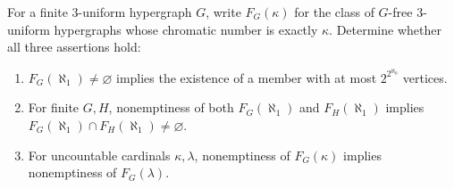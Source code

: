 For a finite $3$-uniform hypergraph $G$, write $F_G(\kappa)$ for the class of $G$-free $3$-uniform hypergraphs whose chromatic number is exactly $\kappa$. Determine whether all three assertions hold:
\begin{enumerate}
\item $F_G(\aleph_1)\ne\varnothing$ implies the existence of a member with at most $2^{2^{\aleph_0}}$ vertices.
\item For finite $G,H$, nonemptiness of both $F_G(\aleph_1)$ and $F_H(\aleph_1)$ implies $F_G(\aleph_1)\cap F_H(\aleph_1)\ne\varnothing$.
\item For uncountable cardinals $\kappa,\lambda$, nonemptiness of $F_G(\kappa)$ implies nonemptiness of $F_G(\lambda)$.
\end{enumerate}
